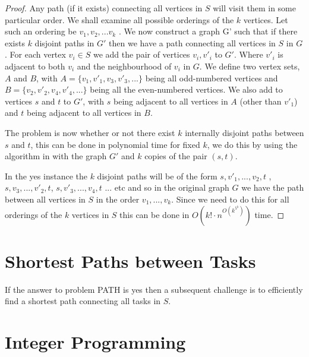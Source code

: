 \documentclass{DAC}
\begin{document}
\begin{proof}
Any path (if it exists) connecting all vertices in $S$ will visit them in some particular order. We shall examine all possible orderings of the $k$ vertices. Let such an ordering be $v_1, v_2, ...v_k$ . 
We now construct a graph G' such that if there exists $k$ disjoint paths in $G'$ then we have a path connecting all vertices in $S$ in $G$.
 For each vertex $v_i \in S$ we add the pair of vertices $v_i , v'_i$ to $G'$. Where $v'_i$ is adjacent to both $v_i$ and the neighbourhood of $v_i$ in $G$. 
We define two vertex sets, $A$ and $B$, with $A = \{v_1,v'_1,v_3,v'_3,...\}$ being all odd-numbered vertices and $B = \{v_2,v'_2,v_4,v'_4,...\}$ being all the even-numbered vertices.
We also add to vertices $s$ and $t$ to $G'$, with $s$ being adjacent to all vertices in $A$ (other than $v'_1$) and $t$ being adjacent to all vertices in $B$.

The problem is now whether or not there exist $k$ internally disjoint paths between $s$ and $t$, this can be done in polynomial time for fixed $k$, we do this by using the algorithm in \cite{lochet2021} with the graph $G'$ and $k$ copies of the pair $(s,t)$.

In the yes instance the $k$ disjoint paths will be of the form $s,v'_1,...,v_2,t$ , $s,v_3,...,v'_2,t$, $s,v'_3,...,v_4,t$ ... etc   and so in the original graph $G$ we have the path between all vertices in $S$ in the order  $v_1,...,v_k$. 
Since we need to do this for all orderings of the $k$ vertices in $S$ this can be done in $O(k!\cdot n^{O(k^{5^k})})$ time.
\end{proof}


\section{Shortest Paths between Tasks}
If the answer to problem PATH is yes then a subsequent challenge is to efficiently find a shortest path connecting all tasks in $S$.

\section{Integer Programming}
\label{sec:integer_program}
\end{document}
